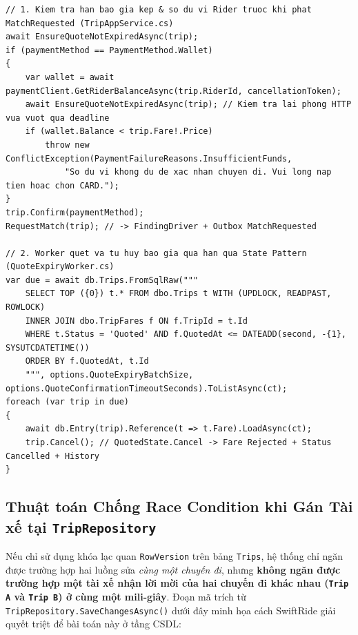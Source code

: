\documentclass[12pt,a4paper]{article}
\begin{document}
\begin{lstlisting}[caption={Kiem tra so du vi truoc Confirm, huy chuyen CancelAsync va tu huy bao gia QuoteExpiryDispatcher}]
// 1. Kiem tra han bao gia kep & so du vi Rider truoc khi phat MatchRequested (TripAppService.cs)
await EnsureQuoteNotExpiredAsync(trip);
if (paymentMethod == PaymentMethod.Wallet)
{
    var wallet = await paymentClient.GetRiderBalanceAsync(trip.RiderId, cancellationToken);
    await EnsureQuoteNotExpiredAsync(trip); // Kiem tra lai phong HTTP vua vuot qua deadline
    if (wallet.Balance < trip.Fare!.Price)
        throw new ConflictException(PaymentFailureReasons.InsufficientFunds,
            "So du vi khong du de xac nhan chuyen di. Vui long nap tien hoac chon CARD.");
}
trip.Confirm(paymentMethod);
RequestMatch(trip); // -> FindingDriver + Outbox MatchRequested

// 2. Worker quet va tu huy bao gia qua han qua State Pattern (QuoteExpiryWorker.cs)
var due = await db.Trips.FromSqlRaw("""
    SELECT TOP ({0}) t.* FROM dbo.Trips t WITH (UPDLOCK, READPAST, ROWLOCK)
    INNER JOIN dbo.TripFares f ON f.TripId = t.Id
    WHERE t.Status = 'Quoted' AND f.QuotedAt <= DATEADD(second, -{1}, SYSUTCDATETIME())
    ORDER BY f.QuotedAt, t.Id
    """, options.QuoteExpiryBatchSize, options.QuoteConfirmationTimeoutSeconds).ToListAsync(ct);
foreach (var trip in due)
{
    await db.Entry(trip).Reference(t => t.Fare).LoadAsync(ct);
    trip.Cancel(); // QuotedState.Cancel -> Fare Rejected + Status Cancelled + History
}
\end{lstlisting}

\subsection{Thuật toán Chống Race Condition khi Gán Tài xế tại \texttt{TripRepository}}
Nếu chỉ sử dụng khóa lạc quan \texttt{RowVersion} trên bảng \texttt{Trips}, hệ thống chỉ ngăn được trường hợp hai luồng sửa \textit{cùng một chuyến đi}, nhưng \textbf{không ngăn được trường hợp một tài xế nhận lời mời của hai chuyến đi khác nhau (\texttt{Trip A} và \texttt{Trip B}) ở cùng một mili-giây}. Đoạn mã trích từ \texttt{TripRepository.SaveChangesAsync()} dưới đây minh họa cách SwiftRide giải quyết triệt để bài toán này ở tầng CSDL:
\end{document}
